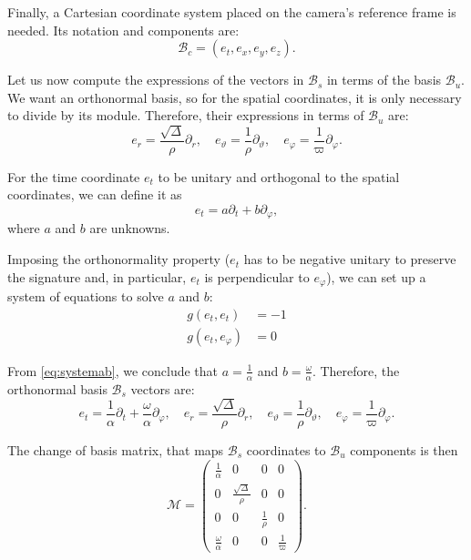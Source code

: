 Finally, a Cartesian coordinate system placed on the camera's reference frame is needed. Its notation and components are:
\[
	\mathcal{B}_c = (e_t, e_x, e_y, e_z).
\]

Let us now compute the expressions of the vectors in $\mathcal{B}_s$ in terms of the basis $\mathcal{B}_u$. We want an orthonormal basis, so for the spatial coordinates, it is only necessary to divide by its module. Therefore, their expressions in terms of $\mathcal{B}_u$ are:
\begin{equation}
	e_r = \frac{\sqrt{\Delta}}{\rho} \partial_r, \quad
	e_\vartheta = \frac{1}{\rho} \partial_\vartheta, \quad
	e_\varphi = \frac{1}{\varpi} \partial_\varphi.
\end{equation}

For the time coordinate $e_t$ to be unitary and orthogonal to the spatial coordinates, we can define it as
\[
	e_t = a\partial_t + b\partial_\varphi,
\]
where $a$ and $b$ are unknowns.

Imposing the orthonormality property ($e_t$ has to be negative unitary to preserve the signature and, in particular, $e_t$ is perpendicular to $e_\varphi$), we can set up a system of equations to solve $a$ and $b$:
\begin{align}
	\label{eq:systemab}
	g(e_t, e_t) &= -1 \\ \nonumber
	g(e_t, e_\varphi) &= 0
\end{align}

From \autoref{eq:systemab}, we conclude that $a = \frac{1}{\alpha}$ and $b = \frac{\omega}{\alpha}$. Therefore, the orthonormal basis $\mathcal{B}_s$ vectors are:
\begin{equation}
	e_t = \frac{1}{\alpha}\partial_t + \frac{\omega}{\alpha}\partial_\varphi, \quad
	e_r = \frac{\sqrt{\Delta}}{\rho} \partial_r, \quad
	e_\vartheta = \frac{1}{\rho} \partial_\vartheta, \quad
	e_\varphi = \frac{1}{\varpi} \partial_\varphi.
\end{equation}

The change of basis matrix, that maps $\mathcal{B}_s$ coordinates to $\mathcal{B}_u$ components is then
\begin{equation}
	\mathcal{M} = \begin{pmatrix}
	\frac{1}{\alpha} & 0 & 0 & 0 \\
	0 & \frac{\sqrt{\Delta}}{\rho} & 0 & 0 \\
	0 & 0 & \frac{1}{\rho} & 0 \\
	\frac{\omega}{\alpha} & 0 & 0 & \frac{1}{\varpi}
	\end{pmatrix}.
\end{equation}

